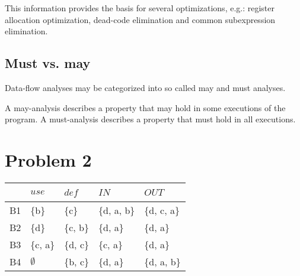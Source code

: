 \documentclass[twoside]{article}
\begin{document}
\begin{multicols}{2}
    This information provides the basis for several optimizations, e.g.: register allocation optimization, dead-code elimination and common subexpression elimination.

    \subsection{Must vs. may}

    Data-flow analyses may be categorized into so called may and must analyses.

    A may-analysis describes a property that may hold in some executions of the program.
    A must-analysis describes a property that must hold in all executions.

\end{multicols}
\newpage

    \section{Problem 2}

    \begin{table}[h]
        \centering
        \begin{tabular}{l|l|l|l|l}
        ~   & $use$     & $def$    & $IN$        & $OUT$       \\ \hline
        B1  & \{b\}     & \{c\}    & \{d, a, b\} & \{d, c, a\} \\
        B2  & \{d\}     & \{c, b\} & \{d, a\}    & \{d, a\}    \\
        B3  & \{c, a\}  & \{d, c\} & \{c, a\}    & \{d, a\}    \\
        B4  & $\emptyset$ & \{b, c\} & \{d, a\}    & \{d, a, b\} \\
        \end{tabular}
        \end{table}
    
\end{document}
